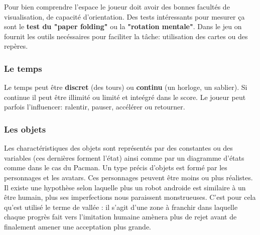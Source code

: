Pour bien comprendre l'espace le joueur doit avoir des bonnes facult\'es de visualisation, de capacit\'e d'orientation. Des tests int\'eressants pour mesurer \c{c}a sont le \textbf{test du "paper folding"} ou la \textbf{"rotation mentale"}. Dans le jeu on fournit les outils nec\'essaires pour faciliter la t\^ache: utilisation des cartes ou des rep\`eres.

\subsubsection{Le temps}

Le temps peut \^etre \textbf{discret} (des tours) ou \textbf{continu} (un horloge, un sablier). Si continue il peut \^etre illimit\'e ou limit\'e et inte\'egr\'e dans le score. Le joueur peut parfois l'influencer: ralentir, pauser, acc\'el\'erer ou retourner. 

\subsubsection{Les objets}

Les charact\'eristiques des objets sont repr\'esent\'es par des constantes ou des variables (ces derni\`eres forment l'\'etat) ainsi comme par un diagramme d'\'etats comme dans le cas du Pacman. Un type pr\'ecis d'objets est form\'e par les personnages et les avatars. Ces personnages peuvent \^etre moins ou plus r\'ealistes. Il existe une hypoth\`ese selon laquelle plus un robot androide est similaire \`a un \^etre humain, plus ses imperfections nous paraissent monstrueuses. C'est pour cela qu'est utilis\'e le terme de vall\'ee : il s'agit d'une zone \`a franchir dans laquelle chaque progr\`es fait vers l'imitation humaine am\`enera plus de rejet avant de finalement amener une acceptation plus grande.

\begin{figure}[H]
\centering
{}
\end{figure}

